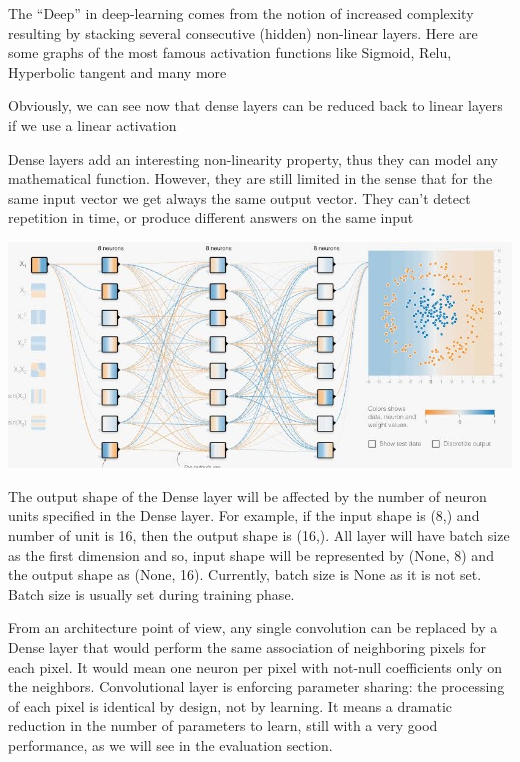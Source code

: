 \documentclass[12pt]{article}
\newcommand{\nd}{\noindent}
\begin{document}
\nd The “Deep” in deep-learning comes from the notion of increased complexity resulting by stacking several consecutive (hidden) non-linear layers. Here are some graphs of the most famous activation functions like Sigmoid, Relu, Hyperbolic tangent and many more 

\nd Obviously, we can see now that dense layers can be reduced back to linear layers if we use a linear activation

\nd Dense layers add an interesting non-linearity property, thus they can model any mathematical function. However, they are still limited in the sense that for the same input vector we get always the same output vector. They can’t detect repetition in time, or produce different answers on the same input

\begin{center}
\centerline{\includegraphics[scale=.5]{dense.jpg}}
\end{center}

\nd The output shape of the Dense layer will be affected by the number of neuron units specified in the Dense layer. For example, if the input shape is (8,) and number of unit is 16, then the output shape is (16,). All layer will have batch size as the first dimension and so, input shape will be represented by (None, 8) and the output shape as (None, 16). Currently, batch size is None as it is not set. Batch size is usually set during training phase.

\nd From an architecture point of view, any single convolution can be replaced by a Dense layer that would perform the same association of neighboring pixels for each pixel. It would mean one neuron per pixel with not-null coefficients only on the neighbors. Convolutional layer is enforcing parameter sharing: the processing of each pixel is identical by design, not by learning. It means a dramatic reduction in the number of parameters to learn, still with a very good performance, as we will see in the evaluation section.
\end{document}
